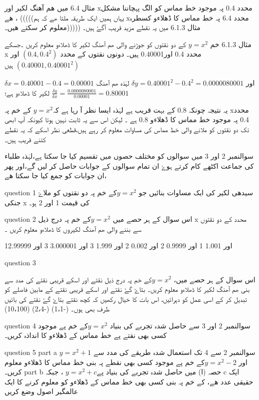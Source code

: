 مثال 6.4 میں  ھم آھنگ لکیر اور  xمحدد 0.4 پہ موجود خط مماس کو الگ پہچاننا  مشکل ھے ، (((((یہاں ہمیں ایک طریقہ ملتا ھے کہ ہم  xمحدد 6.4 پہ خط مماس کا ڈھلاءو کسطرہ معلوم کر سکتے ھیں۔)))))
مثال 6.1.3 میں یہ نقطے مزید قریب آگۓ ہیں۔

مثال 6.1.3
خم \( y=x^{2}\) کے دو نقتوں کو جوڑنے والی ھم آھنگ لکیر کا ڈھلاءو معلوم کریں ۔جسکے x محدد 0.4 اور0.40001 ہیں۔
دونوں نقتوں کے محدد  \( ( 0.4,0.4^{2} ) \)  اور            \( (0.40001 , 0.40001^{2}) \)           ہیں 

\( \delta x = 0.40001-0.4=0.00001\)  اور   \(\delta y =0.40001^{2}-0.4^{2}=0.0000080001\)
لہٰذہ ھم آھنگ لکیر کا ڈھلاءو ہے؛
      \(\frac{\delta y}{\delta x}=\frac{0.0000080001}{0.00001}=0.80001\)          

یہ نتیجہ چونکہ 0.8 کے بہت قریب ہے لہٰذہ ایسا نظر آ رہا ہے کہ\( y=x^{2} \) کے خم پہ xمحدد  0.4 پہ موجود     خط مماس کا ڈھلاءو  0.8 ہے ۔ لیکن اس سے یہ ثابت نہیں ہوتا کیونکہ آپ ابھی تک دو نقتوں کو ملانے والی خط مماس کی مساوات معلوم کر رہے ہیں،قطعی نظر اسکے کہ یہ نقطے کتنے قریب ہیں۔



سوالنمبر 2 اور 3 میں سوالوں کو مختلف حصوں میں تقسیم کیا جا سکتا ہے،لہٰذہ طلباء کی جماعت اکٹھے کام کرتے ہوۓ ان تمام سوالوں کے جوابات حاصل کر لیں گے،اور پھر ان جوابات کو جمع کیا جا سکتا ھے،

question 1
سیدھی لکیر کی ایک مساوات بنائیں جو \( y=x^{2} \)کے خم پہ دو نقتوں کو ملاۓ جنکی x کی قیمت 1 اور 2 ہو۔

question 2
اس سوال کے ہر حصے میں  \( y=x^{2} \)کے خم پہ  درج ذیل  x محدد  کے  دو نقتوں  سے بننے والی ھم آھنگ لکیروں کا ڈھلاءو معلوم کریں ۔
   
1اور    1.001
1 اور    0.9999    
2 اور   0.002
2 اور 1.999
3 اور 3.000001
3 اور 2.99999

question 3

اس سوال کے ہر حصے میں، \( y=x^{2} \)کے خم پہ درج ذیل نقتے اور اسکے قریبی نقتے کی مدد سے بنی    ھم آھنگ لکیر کا ڈھلاءو معلوم کریں۔ بتاۓ گۓ نقتے اور اسکے قریبی نقتے کے مابین فاصلے کو تبدیل کر کے اسی عمل کو دہرائیں، اس بات کا خیال رکھیں کہ کچھ نقتے بتاۓ گۓ نقتے کی بائیں طرف بھی ہوں۔
(-1،1)  
(-2،4)
(10،100)
  

question 4
سوالنمبر 2 اور 3 سے حاصل شدہ تجربے کی بنیاد \( y=x^{2} \)کے خم پے موجود کسی بھی نقتے پے خط مماس کے ڈھلاءو کا انداذہ کریں۔

question 5
part a
سوالنمبر 2 سے 4 تک استعمال شدہ طریقے کی مدد سے \( y=x^{2} +1 \)اور \( y=x^{2} -2 \)کے خم پے موجود کسی بھی نقطے پہ بنی خط مماس  کا ڈھلاءو معلوم کریں۔
part b
حصہ (ا) میں حاصل شدہ تجربے کی بنیاد پے\( y=x^{2} +c \) ، جبکہ c ایک حقیقی عدد ھے،   کے خم پہ بنی کسی بھی خط مماس کے ڈھلاءو کو معلوم کرنے کا ایک عالمگیر اصول وضع کریں 

